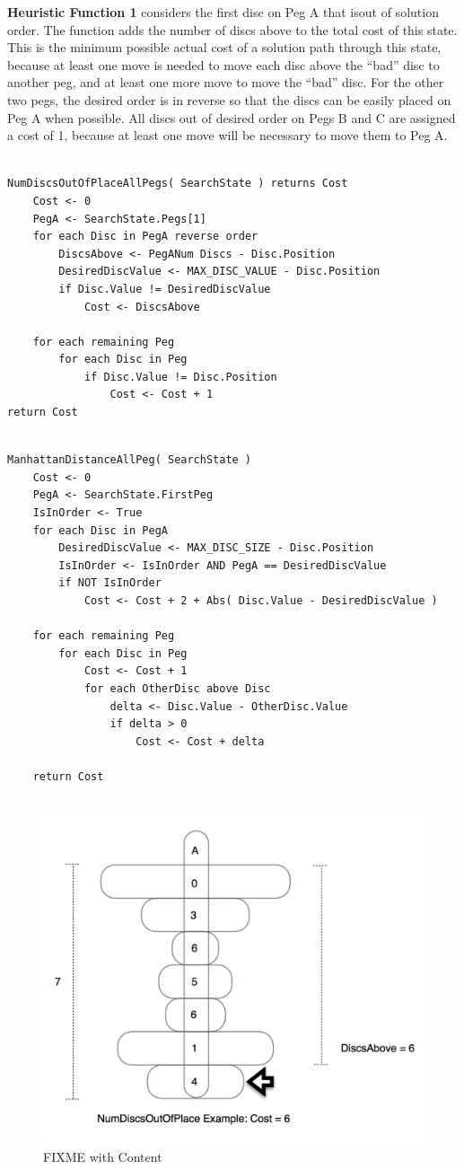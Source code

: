 \documentclass{article}
\begin{document}
\textbf{Heuristic Function 1 }considers the first disc on Peg A that isout of solution order. The function adds the number of discs above to the total cost of this state. This is the minimum possible actual cost of a solution path through this state, because at least one move is needed to move each disc above the “bad” disc to another peg, and at least one more move to move the “bad” disc.  For the other two pegs, the desired order is in reverse so that the discs can be easily placed on Peg A when possible. All discs out of desired order on Pegs B and C are assigned a cost of 1, because at least one move will be necessary to move them to Peg A.

\begin{lstlisting}[frame=single]

NumDiscsOutOfPlaceAllPegs( SearchState ) returns Cost
	Cost <- 0
	PegA <- SearchState.Pegs[1]
	for each Disc in PegA reverse order
		DiscsAbove <- PegANum Discs - Disc.Position
		DesiredDiscValue <- MAX_DISC_VALUE - Disc.Position
		if Disc.Value != DesiredDiscValue
			Cost <- DiscsAbove

	for each remaining Peg
		for each Disc in Peg
			if Disc.Value != Disc.Position
  				Cost <- Cost + 1	
return Cost

\end{lstlisting}

\begin{lstlisting}[frame=single]

ManhattanDistanceAllPeg( SearchState )
	Cost <- 0
	PegA <- SearchState.FirstPeg
	IsInOrder <- True
	for each Disc in PegA
		DesiredDiscValue <- MAX_DISC_SIZE - Disc.Position
		IsInOrder <- IsInOrder AND PegA == DesiredDiscValue
		if NOT IsInOrder
			Cost <- Cost + 2 + Abs( Disc.Value - DesiredDiscValue )

	for each remaining Peg
		for each Disc in Peg
			Cost <- Cost + 1
			for each OtherDisc above Disc 
				delta <- Disc.Value - OtherDisc.Value
				if delta > 0
					Cost <- Cost + delta
	
	return Cost


\end{lstlisting}

\begin{figure}[h!]
\centering
\includegraphics[width=0.7\linewidth]{Diagram1.png}
\caption{FIXME with Content}
\label{fig:reflex}
\end{figure}
\end{document}
